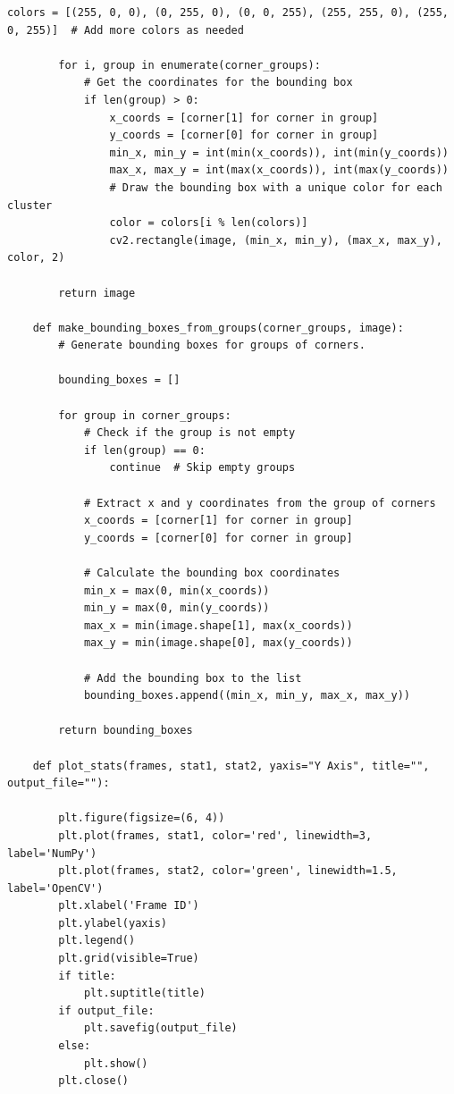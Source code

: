 \documentclass[11pt, conference, letterpaper]{IEEEtran}
\begin{document}
\begin{lstlisting}[style=python, caption={\texttt{plot\_utils.py}}, label={lst:putils}]
        colors = [(255, 0, 0), (0, 255, 0), (0, 0, 255), (255, 255, 0), (255, 0, 255)]  # Add more colors as needed
        
        for i, group in enumerate(corner_groups):
            # Get the coordinates for the bounding box
            if len(group) > 0:
                x_coords = [corner[1] for corner in group]
                y_coords = [corner[0] for corner in group]
                min_x, min_y = int(min(x_coords)), int(min(y_coords))
                max_x, max_y = int(max(x_coords)), int(max(y_coords))
                # Draw the bounding box with a unique color for each cluster
                color = colors[i % len(colors)]
                cv2.rectangle(image, (min_x, min_y), (max_x, max_y), color, 2)
    
        return image
    
    def make_bounding_boxes_from_groups(corner_groups, image):
        # Generate bounding boxes for groups of corners.
        
        bounding_boxes = []
        
        for group in corner_groups:
            # Check if the group is not empty
            if len(group) == 0:
                continue  # Skip empty groups
    
            # Extract x and y coordinates from the group of corners
            x_coords = [corner[1] for corner in group]
            y_coords = [corner[0] for corner in group]
            
            # Calculate the bounding box coordinates
            min_x = max(0, min(x_coords))
            min_y = max(0, min(y_coords))
            max_x = min(image.shape[1], max(x_coords))
            max_y = min(image.shape[0], max(y_coords))
            
            # Add the bounding box to the list
            bounding_boxes.append((min_x, min_y, max_x, max_y))
    
        return bounding_boxes
    
    def plot_stats(frames, stat1, stat2, yaxis="Y Axis", title="", output_file=""):
        
        plt.figure(figsize=(6, 4))
        plt.plot(frames, stat1, color='red', linewidth=3, label='NumPy')
        plt.plot(frames, stat2, color='green', linewidth=1.5, label='OpenCV')
        plt.xlabel('Frame ID')
        plt.ylabel(yaxis)
        plt.legend()
        plt.grid(visible=True)
        if title:
            plt.suptitle(title)
        if output_file:
            plt.savefig(output_file)
        else:
            plt.show()
        plt.close()
    

\end{lstlisting}
\end{document}
